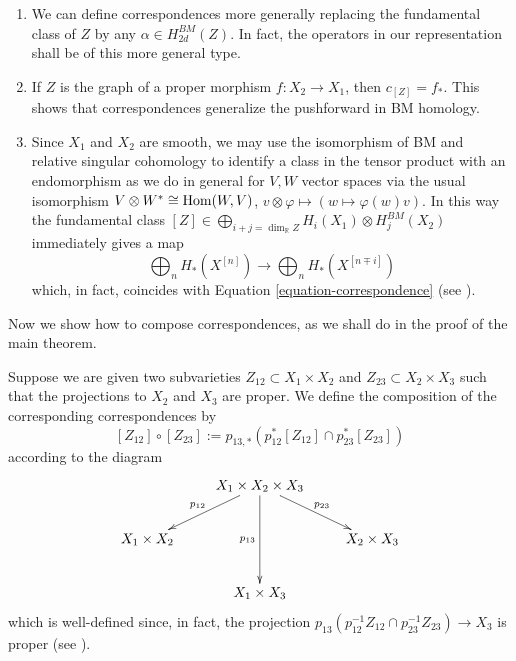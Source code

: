 \begin{remark}
\label{remark-notes}
\begin{enumerate}
\item
\label{item-any-class}
We can define correspondences more generally
replacing the fundamental class of $Z$
by any $\alpha \in H_{2d}^{BM}(Z)$.
In fact, the operators in our representation
shall be of this more general type.

\item If $Z$ is the graph of a proper
morphism
$f:X_2 \to X_1$, then $c_{[Z]}=f_*$.
This shows that correspondences generalize
the pushforward in BM homology.

\item Since $X_1$ and $X_2$ are smooth,
we may use the isomorphism of BM and
relative singular cohomology
to identify a class in the tensor product
with an endomorphism
as we do in general for $V,W$ vector spaces
via the usual isomorphism
$V \otimes W^* \cong \mathop{\mathrm{Hom}}\nolimits(W,V)$, $v \otimes
\varphi \mapsto
(w \mapsto \varphi(w)v)$.
In this way the fundamental class
$[Z] \in
\bigoplus_{i+j=\dim_\mathbb{R}Z}H_i(X_1)\otimes H_j^{BM}(X_2)$
immediately gives a map
$$
\bigoplus_{n}H_* (X^{[n]}) \to
\bigoplus_{n}H_* (X^{[n\mp i]})
$$
which, in fact, coincides with Equation
\ref{equation-correspondence}
(see \cite[Section 8.3]{Nakajima-lectures}).

\end{enumerate}
\end{remark}

\medskip\noindent
Now we show how to compose correspondences,
as we shall do in the proof of the main
theorem.

Suppose we are given two subvarieties
$Z_{12} \subset X_1 \times X_2$ and $Z_{23}
\subset X_2 \times X_3$
such that the projections to $X_2$ and $X_3$
are proper.
We define the composition of the
corresponding correspondences by
\begin{equation}
\label{equation-composition}
[Z_{12}]\circ[Z_{23}]:=p_{13,*}(p_{12}^*
[Z_{12}]\cap p_{23}^* [Z_{23}])
\end{equation}
according to the diagram
$$
\xymatrix{
&  X_1 \times X_2 \times
X_3\ar[dl]_{p_{12}}\ar[dr]^{p_{23}}\ar[dd]_{p_{13}}\\
 X_1\times X_2& & X_2\times X_3\\
& X_1\times X_3
}
$$
which is well-defined since, in fact,
the projection $p_{13}(p_{12}^{-1}Z_{12}
\cap p_{23}^{-1} Z_{23})\to X_3$
is proper (see \cite[Section
8.3]{Nakajima-lectures}).




